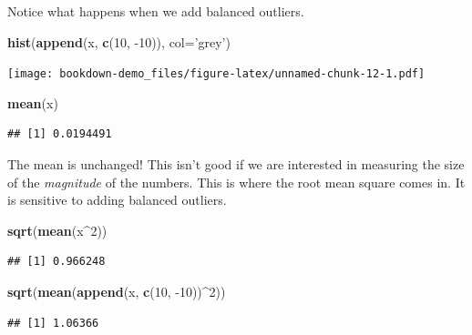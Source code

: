 \documentclass[]{book}
\newenvironment{Shaded}{\begin{snugshade}}{\end{snugshade}}
\newcommand{\DataTypeTok}[1]{\textcolor[rgb]{0.13,0.29,0.53}{#1}}
\newcommand{\DecValTok}[1]{\textcolor[rgb]{0.00,0.00,0.81}{#1}}
\newcommand{\KeywordTok}[1]{\textcolor[rgb]{0.13,0.29,0.53}{\textbf{#1}}}
\newcommand{\NormalTok}[1]{#1}
\newcommand{\OperatorTok}[1]{\textcolor[rgb]{0.81,0.36,0.00}{\textbf{#1}}}
\newcommand{\StringTok}[1]{\textcolor[rgb]{0.31,0.60,0.02}{#1}}
\begin{document}
Notice what happens when we add balanced outliers.

\begin{Shaded}
\begin{Highlighting}[]
\KeywordTok{hist}\NormalTok{(}\KeywordTok{append}\NormalTok{(x, }\KeywordTok{c}\NormalTok{(}\DecValTok{10}\NormalTok{, }\DecValTok{-10}\NormalTok{)), }\DataTypeTok{col=}\StringTok{'grey'}\NormalTok{)}
\end{Highlighting}
\end{Shaded}

\texttt{[image: bookdown-demo\_files/figure-latex/unnamed-chunk-12-1.pdf]}

\begin{Shaded}
\begin{Highlighting}[]
\KeywordTok{mean}\NormalTok{(x)}
\end{Highlighting}
\end{Shaded}

\begin{verbatim}
## [1] 0.0194491
\end{verbatim}

The mean is unchanged! This isn't good if we are interested in measuring the size of the \emph{magnitude} of the numbers. This is where the root mean square comes in. It is sensitive to adding balanced outliers.

\begin{Shaded}
\begin{Highlighting}[]
\KeywordTok{sqrt}\NormalTok{(}\KeywordTok{mean}\NormalTok{(x}\OperatorTok{^}\DecValTok{2}\NormalTok{))}
\end{Highlighting}
\end{Shaded}

\begin{verbatim}
## [1] 0.966248
\end{verbatim}

\begin{Shaded}
\begin{Highlighting}[]
\KeywordTok{sqrt}\NormalTok{(}\KeywordTok{mean}\NormalTok{(}\KeywordTok{append}\NormalTok{(x, }\KeywordTok{c}\NormalTok{(}\DecValTok{10}\NormalTok{, }\DecValTok{-10}\NormalTok{))}\OperatorTok{^}\DecValTok{2}\NormalTok{))}
\end{Highlighting}
\end{Shaded}

\begin{verbatim}
## [1] 1.06366
\end{verbatim}
\end{document}
